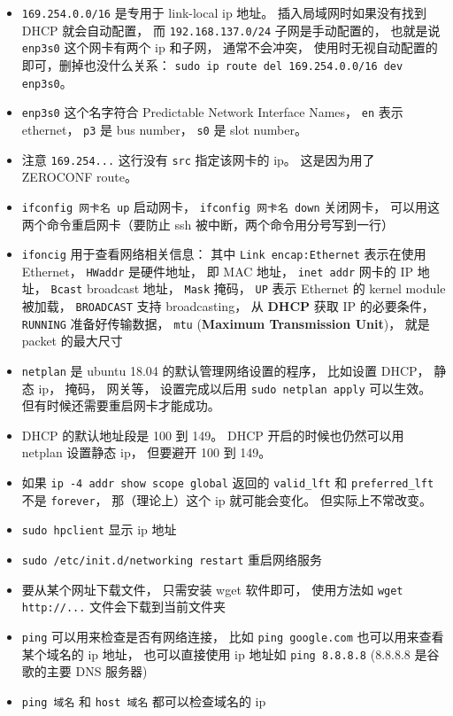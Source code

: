 \begin{itemize}
\item \verb`169.254.0.0/16` 是专用于 link-local ip 地址。 插入局域网时如果没有找到 DHCP 就会自动配置， 而 \verb`192.168.137.0/24` 子网是手动配置的， 也就是说 \verb`enp3s0` 这个网卡有两个 ip 和子网， 通常不会冲突， 使用时无视自动配置的即可，删掉也没什么关系： \verb`sudo ip route del 169.254.0.0/16 dev enp3s0`。
\item \verb`enp3s0` 这个名字符合 Predictable Network Interface Names， \verb`en` 表示 ethernet， \verb`p3` 是 bus number， \verb`s0` 是 slot number。
\item 注意 \verb`169.254...` 这行没有 \verb`src` 指定该网卡的 ip。 这是因为用了 ZEROCONF route。
\item \verb`ifconfig 网卡名 up` 启动网卡， \verb`ifconfig 网卡名 down` 关闭网卡， 可以用这两个命令重启网卡（要防止 ssh 被中断，两个命令用分号写到一行）
\item \verb`ifoncig` 用于查看网络相关信息： 其中 \verb`Link encap:Ethernet` 表示在使用 Ethernet， \verb`HWaddr` 是硬件地址， 即 MAC 地址， \verb`inet addr` 网卡的 IP 地址， \verb`Bcast` broadcast 地址， \verb`Mask` 掩码， \verb`UP` 表示 Ethernet 的 kernel module 被加载， \verb`BROADCAST` 支持 broadcasting， 从 \textbf{DHCP} 获取 IP 的必要条件， \verb`RUNNING` 准备好传输数据， \verb`mtu` (\textbf{Maximum Transmission Unit})， 就是 packet 的最大尺寸
\item \verb`netplan` 是 ubuntu 18.04 的默认管理网络设置的程序， 比如设置 DHCP， 静态 ip， 掩码， 网关等， 设置完成以后用 \verb`sudo netplan apply` 可以生效。 但有时候还需要重启网卡才能成功。
\item DHCP 的默认地址段是 100 到 149。 DHCP 开启的时候也仍然可以用 netplan 设置静态 ip， 但要避开 100 到 149。
\item 如果 \verb`ip -4 addr show scope global` 返回的 \verb`valid_lft` 和 \verb`preferred_lft` 不是 \verb`forever`， 那（理论上）这个 ip 就可能会变化。 但实际上不常改变。
\item \verb`sudo hpclient` 显示 ip 地址
\item \verb`sudo /etc/init.d/networking restart` 重启网络服务 
\item 要从某个网址下载文件， 只需安装 wget 软件即可， 使用方法如 \verb`wget http://...` 文件会下载到当前文件夹
\item \verb`ping` 可以用来检查是否有网络连接， 比如 \verb`ping google.com` 也可以用来查看某个域名的 ip 地址， 也可以直接使用 ip 地址如 \verb`ping 8.8.8.8` (8.8.8.8 是谷歌的主要 DNS 服务器)
\item \verb`ping 域名` 和 \verb`host 域名` 都可以检查域名的 ip

\end{itemize}
